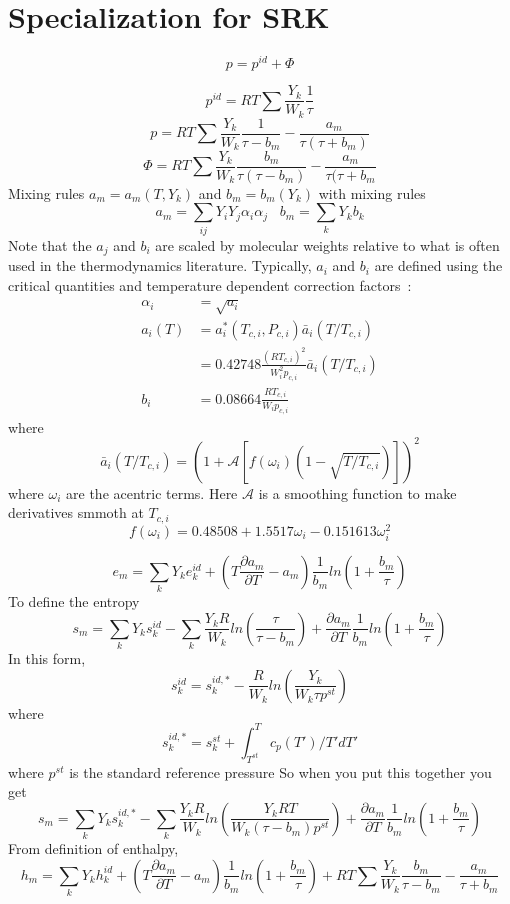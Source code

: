 \documentclass[11pt]{article}
\newcommand{\MarginPar}[1]{\marginpar{%
\vskip-\baselineskip %
\raggedright\tiny\sffamily
\hrule\smallskip{\color{red}#1}\par\smallskip\hrule}}
\newcommand{\jbb}[1]{{\bf[{\color{red}{JBB:  #1}}]}}
\begin{document}
\section{Specialization for SRK}
\label{sec:eos}


\[
p = p^{id} + \Phi
\]

\[
p^{id} = R T \sum \frac{Y_k}{W_k} \frac{1}{\tau}
\]
\[
\label{eq:pSRK}
p = R T \sum \frac{Y_k}{W_k} \frac{1}{\tau - b_m} - \frac{a_m}{\tau(\tau + b_m)}
\]
\[
\Phi
= R T \sum \frac{Y_k}{W_k} \frac{b_m}{\tau(\tau -b_m)} - \frac{a_m}{\tau (\tau + b_m}
\]
Mixing rules $a_m = a_m(T, Y_k)$ and $b_m = b_m(Y_k)$
with mixing rules
\[
a_m = \sum_{ij} Y_i Y_j \alpha_i \alpha_j \;\;\;  b_m = \sum_k Y_k b_k
\]
Note that the $a_j$ and $b_i$ are scaled by molecular weights relative to what is often used
in the thermodynamics literature.
\MarginPar{need to fix these}
Typically, $a_i$ and $b_i$ are defined using the critical quantities and temperature dependent correction factors~\cite{poling2001properties}:
\begin{align}
\alpha_i & = \sqrt{a_i} \nonumber \\
a_i(T) &= a_i^{*}\left(T_{c,i},P_{c,i}\right) \bar{a}_i (T/T_{c,i})  \nonumber \\
       &= 0.42748 \frac{\left(R T_{c,i} \right)^2}{W_i^2 p_{c,i}} \bar{a}_i \left(T/T_{c,i}\right)  \nonumber \\
 b_i &= 0.08664 \frac{R T_{c,i}}{W_i p_{c,i}}   
       \label{eq:abformEOS}
\end{align}
where
\[
\bar{a}_i (T/T_{c,i}) = \left(1 + \mathcal{A} \left[ f\left( \omega_i \right) \left(1-\sqrt{T/T_{c,i}} \right ) \right] \right)^2
\]
where $\omega_i$ are the acentric terms.
Here $\mathcal{A}$ is a smoothing function to make derivatives smmoth at $T_{c,i}$
\[
f\left( \omega_i \right) = 0.48508 + 1.5517 \omega_i - 0.151613 \omega_{i}^2
\]

\[
e_m = \sum_k Y_k e_k^{id} + \left( T  \frac{\partial a_m}{\partial T}  - a_m \right)
\frac{1}{b_m} ln ( 1 + \frac{b_m}{\tau})
\]
To define the entropy 
\begin{equation}
s_m = \sum_k Y_k s_k^{id} - 
 \sum_k \frac{Y_k R}{W_k} ln \left(\frac{\tau}{\tau-b_m} \right)
+ \frac{\partial a_m}{\partial T} \frac{1}{b_m} ln ( 1 + \frac{b_m}{\tau})
\end{equation}
In this form, 
\[
s_k^{id} = s_k^{id,*} - \frac{R}{W_k} ln(\frac{Y_k}{W_k \tau  p^{st}})
\]
where
\[
s_k^{id,*} = s_k^{st} + \int_{T^{st}}^T  c_p(T')/T' dT'
\]
where $p^{st}$ is the standard reference pressure
So when you put this together you get
\[
s_m = \sum_k Y_k s_k^{id,*} - \sum_k \frac{Y_k R}{W_k} ln  \left( \frac{Y_k R T}{W_k (\tau -b_m) p^{st}}   \right )
+ \frac{\partial a_m}{\partial T} \frac{1}{b_m} ln ( 1 + \frac{b_m}{\tau})
\]
From definition of enthalpy,
\[
\label{eq:hmSRK}
h_m = \sum_k Y_k h_k^{id} + \left ( T \frac{\partial a_m}{\partial T} - a_m \right)
\frac{1}{b_m} ln ( 1 + \frac{b_m}{\tau})
+ 
R T \sum \frac{Y_k}{W_k} \frac{b_m}{\tau -b_m} - \frac{a_m}{\tau + b_m}
\]
\end{document}
